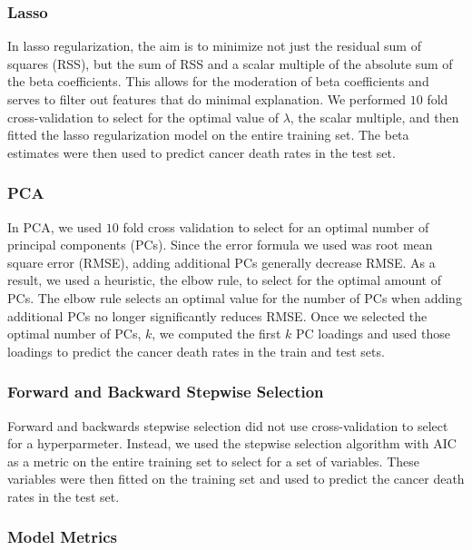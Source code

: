 \documentclass[
  11pt,
]{article}
\begin{document}
\hypertarget{lasso}{%
\subsubsection{Lasso}\label{lasso}}

In lasso regularization, the aim is to minimize not just the residual
sum of squares (RSS), but the sum of RSS and a scalar multiple of the
absolute sum of the beta coefficients. This allows for the moderation of
beta coefficients and serves to filter out features that do minimal
explanation. We performed \(10\) fold cross-validation to select for the
optimal value of \(\lambda\), the scalar multiple, and then fitted the
lasso regularization model on the entire training set. The beta
estimates were then used to predict cancer death rates in the test set.

\hypertarget{pca}{%
\subsubsection{PCA}\label{pca}}

In PCA, we used \(10\) fold cross validation to select for an optimal
number of principal components (PCs). Since the error formula we used
was root mean square error (RMSE), adding additional PCs generally
decrease RMSE. As a result, we used a heuristic, the elbow rule, to
select for the optimal amount of PCs. The elbow rule selects an optimal
value for the number of PCs when adding additional PCs no longer
significantly reduces RMSE. Once we selected the optimal number of PCs,
\(k\), we computed the first \(k\) PC loadings and used those loadings
to predict the cancer death rates in the train and test sets.

\hypertarget{forward-and-backward-stepwise-selection}{%
\subsubsection{Forward and Backward Stepwise
Selection}\label{forward-and-backward-stepwise-selection}}

Forward and backwards stepwise selection did not use cross-validation to
select for a hyperparmeter. Instead, we used the stepwise selection
algorithm with AIC as a metric on the entire training set to select for
a set of variables. These variables were then fitted on the training set
and used to predict the cancer death rates in the test set.

\hypertarget{model-metrics}{%
\subsubsection{Model Metrics}\label{model-metrics}}
\end{document}
